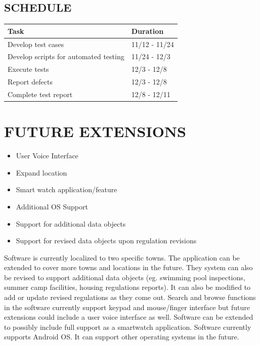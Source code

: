 \documentclass[twoside,letterpaper]{article}
\begin{document}
\subsection{SCHEDULE}
{\rmfamily\color{black}
\begin{center}
\begin{tabular}{ | M{5cm} | M{5cm}| } 
\hline
\textbf{Task} & \textbf{Duration}\\ 
\hline
Develop test cases & 11/12 - 11/24 \\ 
\hline
Develop scripts for automated testing & 11/24 - 12/3 \\ 
\hline
Execute tests & 12/3 - 12/8 \\ 
\hline
Report defects & 12/3 - 12/8 \\ 
\hline
Complete test report & 12/8 - 12/11 \\ 
\hline
\end{tabular}
\end{center}
}

\clearpage\section{FUTURE EXTENSIONS}
\begin{itemize}
\item{User Voice Interface}
\item{Expand location}
\item{Smart watch application/feature}
\item{Additional OS Support}
\item{Support for additional data objects}
\item{Support for revised data objects upon regulation revisions}
\end{itemize}
{\rmfamily\color{black}
Software is currently localized to two specific towns.  The application can be extended to cover more towns and locations in the future. They system can also be revised to support additional data objects (eg. swimming pool inspections, summer camp facilities, housing regulations reports). It can also be modified to add or update revised regulations as they come out.
Search and browse functions in the software currently support keypad and mouse/finger interface but future extensions could include a user voice interface as well. 
Software can be extended to possibly include full support as a smartwatch application. 
Software currently supports Android OS. It can support other operating systems in the future.}
\end{document}

